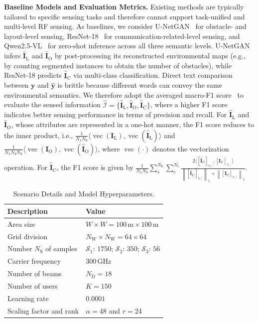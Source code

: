 \documentclass[journal,12pt,onecolumn,draftclsnofoot]{IEEEtran}
\newcommand\IC{\ensuremath{\mathcal{I}}}
\newcommand\SC{\ensuremath{\mathcal{S}}}
\newcommand\yB{\ensuremath{\bm{y}}}
\newcommand\FIF{\ensuremath{\mathbf{I}}}
\newcommand\CR{\ensuremath{\mathrm{C}}}
\newcommand\DR{\ensuremath{\mathrm{D}}}
\newcommand\LR{\ensuremath{\mathrm{L}}}
\newcommand\ROR{\ensuremath{\mathrm{O}}}
\newcommand\SR{\ensuremath{\mathrm{S}}}
\newcommand\WR{\ensuremath{\mathrm{W}}}
\newcommand{\wh}{\widehat}
\begin{document}
{\bf Baseline Models and Evaluation Metrics.} 
Existing methods are typically tailored to specific sensing tasks and therefore cannot support task-unified and multi-level RF sensing. As baselines, we consider U-NetGAN~\cite{hu2025advancing} for obstacle- and layout-level sensing, ResNet-18~\cite{7780459} for communication-related-level sensing, and  Qwen2.5-VL~\cite{bai2025qwen2} for zero-shot inference across all three semantic levels. U-NetGAN infers $\wh{\FIF}_{\LR}$ and $\wh{\FIF}_{\ROR}$ by post-processing its reconstructed environmental maps (e.g., by counting segmented instances to obtain the number of obstacles), while ResNet-18 predicts $\wh{\FIF}_{\CR}$ via multi-class classification. Direct text comparison between $\yB$ and $\wh{\yB}$ is brittle because different words can convey the same environmental semantics. We therefore adopt the averaged macro-F1 score~\cite{11200914} to evaluate the sensed information $\wh{\IC}=\{\wh{\FIF}_{\LR},\wh{\FIF}_{\ROR},\wh{\FIF}_{\CR}\}$, where a higher F1 score indicates better sensing performance in terms of precision and recall. For $\wh{\FIF}_{\LR}$ and $\wh{\FIF}_{\ROR}$, whose attributes are represented in a one-hot manner, the F1 score reduces to the inner product, i.e., $\frac{1}{N_{1}N_{\SR}}\langle\operatorname{vec}(\FIF_{\LR}), \operatorname{vec}(\wh{\FIF}_{\LR})\rangle$ and $\frac{1}{N_{1}N_{3}N_{\SR}}\langle\operatorname{vec}(\FIF_{\ROR}), \operatorname{vec}(\wh{\FIF}_{\ROR})\rangle$, where $\operatorname{vec}(\cdot)$ denotes the vectorization operation. For $\wh{\FIF}_{\CR}$, the F1 score is given by $\frac{1}{N_{1}N_{\SR}}\sum_{s}^{N_{\SR}}\sum_{c}^{N_{1}}\frac{2\langle [\wh{\FIF}_{\CR}]_{c,:},[\FIF_{\CR}]_{c,:}  \rangle}{\left\|[\wh{\FIF}_{\CR}]_{c,:}\right\|_1+\left\|[\FIF_{\CR}]_{c,:}\right\|_1}$.

\renewcommand{\arraystretch}{1.3}   %
\setlength{\tabcolsep}{5pt}          %

\begin{table}[htbp]
\centering
\caption{Scenario Details and Model Hyperparameters.}
\label{tab_evalution}

\begin{tabular}{
  >{\centering\arraybackslash}p{}|
  >{\centering\arraybackslash}p{}}\hline
\textbf{Description} & \textbf{Value} \\\hline
Area size & $W\times W=100\,\mathrm{m}\times100\,\mathrm{m}$ \\\hline
Grid division & $N_{\WR}\times N_{\WR}=64\times64$ \\\hline
Number $N_{\SR}$ of samples
  & $\SC_1$: $1750$; $\SC_2$: $350$; $\SC_3$: $56$ \\\hline
Carrier frequency & $300\,\mathrm{GHz}$ \\\hline
Number of beams & $N_{\DR}=18$ \\\hline
Number of users & $K=150$  \\\hline
Learning rate & $0.0001$ \\\hline
Scaling factor and rank & $\alpha=48$ and $r=24$ \\\hline
\end{tabular}
\end{table}
\end{document}
